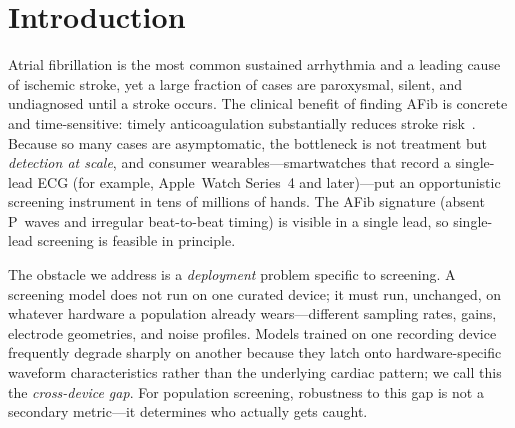 \section{Introduction}
Atrial fibrillation is the most common sustained arrhythmia and a leading cause
of ischemic stroke, yet a large fraction of cases are paroxysmal, silent, and
undiagnosed until a stroke occurs. The clinical benefit of finding AFib is
concrete and time-sensitive: timely anticoagulation substantially reduces stroke
risk~\cite{perez2019appleheart}. Because so many cases are asymptomatic, the
bottleneck is not treatment but \emph{detection at scale}, and consumer
wearables---smartwatches that record a single-lead ECG (for example, Apple~Watch
Series~4 and later)---put an opportunistic screening instrument in tens of
millions of hands. The AFib signature (absent P~waves and irregular beat-to-beat
timing) is visible in a single lead, so single-lead screening is feasible in
principle.

The obstacle we address is a \emph{deployment} problem specific to screening.
A screening model does not run on one curated device; it must run, unchanged, on
whatever hardware a population already wears---different sampling rates, gains,
electrode geometries, and noise profiles. Models trained on one recording device
frequently degrade sharply on another because they latch onto hardware-specific
waveform characteristics rather than the underlying cardiac pattern; we call this
the \emph{cross-device gap}. For population screening, robustness to this gap is
not a secondary metric---it determines who actually gets caught.

